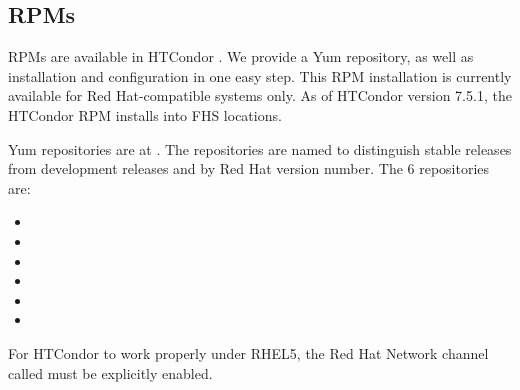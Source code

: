 

\subsection{\label{sec:install-rpms} RPMs}

RPMs are available in HTCondor \VersionNotice.
We provide a Yum repository, as well as 
installation and configuration in one easy step.
This RPM installation is currently available for Red Hat-compatible
systems only.
As of HTCondor version 7.5.1, 
the HTCondor RPM installs into FHS locations.

Yum repositories are at
  .
The repositories are named to distinguish stable releases from
development releases and by Red Hat version number. 
The 6 repositories are:
\begin{itemize}
  \item {}
  \item {}
  \item {}
  \item {}
  \item {}
  \item {}
\end{itemize}

For HTCondor to work properly under RHEL5, 
the Red Hat Network channel called  
must be explicitly enabled.

